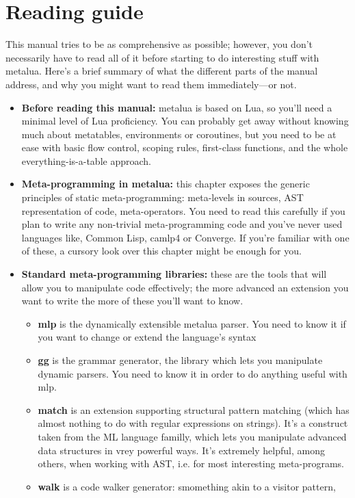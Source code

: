 \section*{Reading guide}
This manual tries to be as comprehensive as possible; however, you don't
necessarily have to read all of it before starting to do interesting stuff with
metalua. Here's a brief summary of what the different parts of the manual
address, and why you might want to read them immediately---or not.

\begin{itemize}
\item{\bf Before reading this manual:} metalua is based on Lua, so
  you'll need a minimal level of Lua proficiency. You can probably get
  away without knowing much about metatables, environments or
  coroutines, but you need to be at ease with basic flow control,
  scoping rules, first-class functions, and the whole
  everything-is-a-table approach.
\item{\bf Meta-programming in metalua:} this chapter exposes the generic principles
  of static meta-programming: meta-levels in sources, AST representation of
  code, meta-operators. You need to read this carefully if you plan to write any
  non-trivial meta-programming code and you've never used languages like, Common
  Lisp, camlp4 or Converge. If you're familiar with one of these, a cursory look
  over this chapter might be enough for you.
\item{\bf Standard meta-programming libraries:} these are the tools that will allow
  you to manipulate code effectively; the more advanced an extension you want to
  write the more of these you'll want to know.
  \begin{itemize}
  \item{\bf mlp} is the dynamically extensible metalua parser. You need to know it
    if you want to change or extend the language's syntax
  \item{\bf gg} is the grammar generator, the library which lets you manipulate
    dynamic parsers. You need to know it in order to do anything useful with
    mlp.
  \item{\bf match} is an extension supporting structural pattern matching (which has
    almost nothing to do with regular expressions on strings). It's a construct
    taken from the ML language familly, which lets you manipulate advanced data
    structures in vrey powerful ways. It's extremely helpful, among others, when
    working with AST, i.e. for most interesting meta-programs.
  \item{\bf walk} is a code walker generator: smomething akin to a visitor pattern,

\end{itemize}
\end{itemize}

